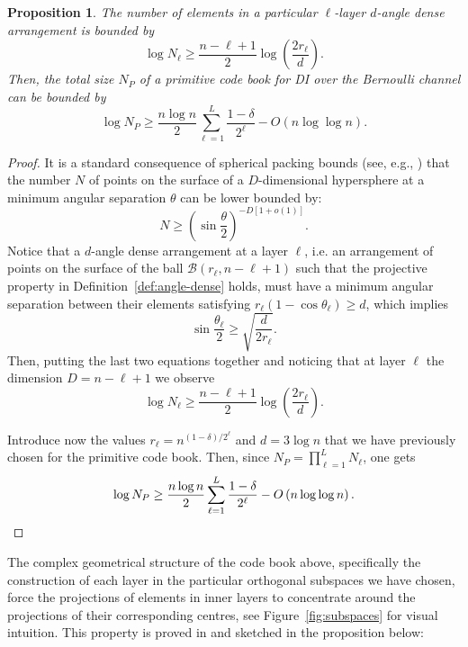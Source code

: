 \documentclass[10pt, conference]{IEEEtran}
\newtheorem{proposition}[theorem]{Proposition}
\newcommand{\1}{\mathds{1}}
\newcommand{\cB}{\mathcal{B}}
\begin{document}
\begin{proposition}\label{proposition:primitive_code_size}
The number of elements in a particular $\ell$-layer $d$-angle dense arrangement is bounded by
\[
\log N_\ell\geq\frac{n-\ell+1}{2}\log\left(\frac{2r_\ell}{d}\right).
\]
Then, the total size $N_P$ of a primitive code book for DI over the Bernoulli channel can be bounded by
\[
\log N_P\geq\frac{n\log n}{2}\sum_{\ell=1}^L\frac{1-\delta}{2^\ell}-O(n\log\log n).
\]

\end{proposition}
\begin{proof}
It is a standard consequence of spherical packing bounds (see, e.g., \cite{packing_book}) that the number $N$ of points on the surface of a $D$-dimensional hypersphere at a minimum angular separation $\theta$ can be lower bounded by:
\begin{equation}
    N\geq\left(\sin\frac\theta2\right)^{-D[1+o(1)]}.
\end{equation}
Notice that a $d$-angle dense arrangement at a layer $\ell$, i.e. an arrangement of points on the surface of the ball $\cB(r_\ell,n-\ell+1)$ such that the projective property in Definition~\ref{def:angle-dense} holds, must have a minimum angular separation between their elements satisfying $r_\ell(1-\cos\theta_\ell) \geq d$, which implies 
\begin{equation}\label{eq:angles}
    \sin\frac{\theta_\ell}{2}\geq\sqrt{\frac{d}{2 r_\ell}}.
\end{equation}
Then, putting the last two equations together and noticing that at layer $\ell$ the dimension $D=n-\ell+1$ we observe
\begin{equation}
\log N_\ell\geq\frac{n-\ell+1}{2}\log\left(\frac{2r_\ell}{d}\right).
\end{equation}

Introduce now the values $r_\ell=n^{(1-\delta)/2^\ell}$ and $d=3\log n$ that we have previously chosen for the primitive code book. Then, since $N_P=\prod_{\ell=1}^LN_\ell$, one gets
\begin{equation*}
\log N_P\geq\frac{n\log n}{2}\sum_{\ell=1}^L\frac{1-\delta}{2^\ell}-O\left(n\log\log n\right).\qedhere
\end{equation*}
\end{proof}

The complex geometrical structure of the code book above, specifically the construction of each layer in the particular orthogonal subspaces we have chosen, force the projections of elements in inner layers to concentrate around the projections of their corresponding centres, see Figure~\ref{fig:subspaces} for visual intuition. This property is proved in \cite[Lemma~11]{CDBW:Gauss} and sketched in the proposition below:
\end{document}
